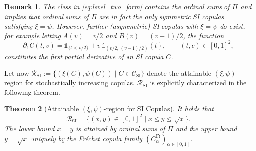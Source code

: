 \documentclass{article}
\newtheorem{theorem}{Theorem}[section]
\newtheorem{remark}[theorem]{Remark}
\newcommand{\1}{\mathds{1}}
\newcommand{\CC}{\mathcal{C}}  %
\begin{document}
\begin{remark}
The class in \eqref{eq:level_two_form} contains the ordinal sums of $\Pi$ and \cite[Thm.~5.1]{siburg2021stochastic} implies that ordinal sums of $\Pi$ are in fact the only \emph{symmetric} SI copulas satisfying $\xi=\psi$.
However, further (asymmetric) SI copulas with $\xi=\psi$ do exist, for example letting $A(v)=v/2$ and $B(v)=(v+1)/2$, the function
\[
\partial_1 C(t,v)
= \1_{\{t< v/2\}}
+ v\,\1_{(v/2,\,(v+1)/2)}(t),
\qquad (t,v)\in[0,1]^2,
\]
constitutes the first partial derivative of an SI copula $C$. %
\end{remark}

Let now
\(
\mathcal{R}_{\text{SI}} := \{ (\xi(C), \psi(C)) \mid C \in \CC_{\text{SI}} \}
\)
denote the attainable $(\xi,\psi)$-region for stochastically increasing copulas.
$\mathcal{R}_{\text{SI}}$ is explicitly characterized in the following theorem.

\begin{theorem}[Attainable $(\xi,\psi)$-region for SI Copulas]
    \label{thm:si_region}
It holds that
\[
    \mathcal{R}_{\text{SI}} = \{ (x,y) \in [0,1]^2 \mid x \le y \le \sqrt{x} \}.
\]
The lower bound $x=y$ is attained by ordinal sums of $\Pi$ and the upper bound $y=\sqrt{x}$ uniquely by the Fréchet copula family $(C^{\text{Fr}}_\alpha)_{\alpha \in [0,1]}$.
\end{theorem}
\end{document}
